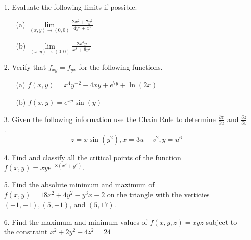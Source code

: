 \documentclass[12pt, amssymb, one column]{article}
\begin{document}
\begin{itemize}
	\item[1.] Evaluate the following limits if possible.
		\begin{itemize}
			\item[(a)] $\lim\limits_{(x,y) \to (0,0)} \frac{2x^2 + 7y^2}{4y^2+x^2}$
			\item[(b)] $\lim\limits_{(x,y) \to (0,0)} \frac{2x^4y}{x^8+6y^2}$
		\end{itemize}
	
	\item[2.] Verify that $f_{xy} = f_{yx}$ for the following functions.
		\begin{itemize}
			\item[(a)]$f(x,y) = x^4y^{-2} -4xy+e^{7y} +\ln(2x)$
			\item[(b)]$f(x,y) = e^{xy}\sin(y)$
		\end{itemize}
	
	\item[3.] Given the following information use the Chain Rule to determine $\frac{\partial z}{\partial u}$ and $\frac{\partial z}{\partial v}$.
	$$z=x\sin(y^2), x=3u-v^2, y=u^6$$
	
	\item[4.] Find and classify all the critical points of the function $f(x,y) = xye^{-8(x^2+y^2)}$.
	
	\item[5.] Find the absolute minimum and maximum of $f(x,y) = 18x^2 + 4y^2 -y^3x-2$ on the triangle with the verticies $(-1,-1),(5,-1)$, and $(5,17)$.
			
	\item[6.] Find the maximum and minimum values of $f(x,y,z) = xyz$ subject to the constraint $x^2 + 2y^2+4z^2 = 24$
\end{itemize}
\end{document}
